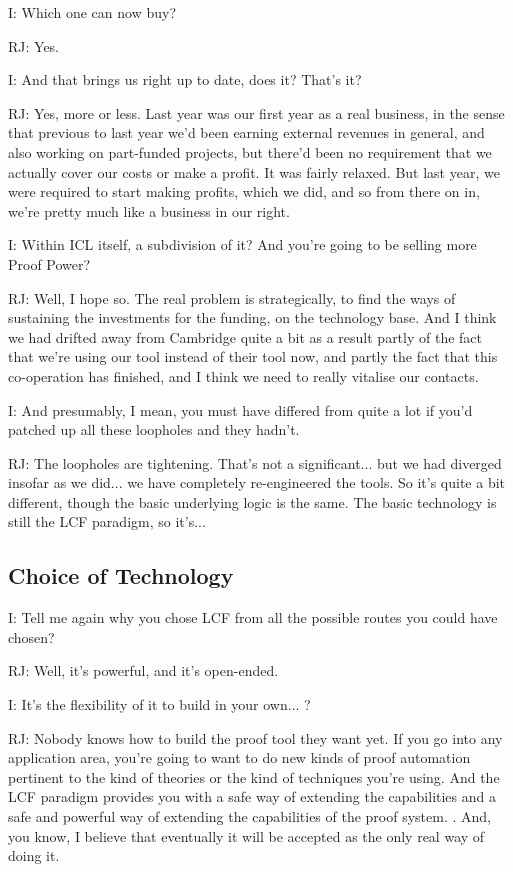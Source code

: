 \documentclass[10pt,titlepage]{book}
\begin{document}
I: Which one can now buy?

RJ: Yes.

I: And that brings us right up to date, does it?
That's it?


RJ: Yes, more or less. Last year was our first year as a real business, in the sense that  previous to last year we'd been earning external revenues in general, and also working on part-funded projects, but there'd been no requirement that we actually cover our costs or make a profit. It was fairly relaxed. But last year, we were required to start making profits, which we did, and so from there on in, we're pretty much like a business in our right.

I: Within ICL itself, a subdivision of it?
And you're going to be selling more Proof Power?

RJ: Well, I hope so.
The real problem is strategically, to find the ways of sustaining the investments for the funding, on the technology base.
And I think we had drifted away from Cambridge quite a bit as a result partly of the fact that we're using our tool instead of their tool now, and partly the fact that this co-operation has finished, and I think we need to really vitalise our contacts.

I: And presumably, I mean, you must have differed from quite a lot if you'd patched up all these loopholes and they hadn't.

RJ: The loopholes are tightening.
That's not a significant... but we had diverged insofar as we did... we have completely re-engineered the tools.
So it's quite a bit different, though the basic underlying logic is the same.
The basic technology is still the LCF paradigm, so it's...

\subsection{Choice of Technology}

I: Tell me again why you chose LCF from all the possible routes you could have chosen?

RJ: Well, it's powerful, and it's open-ended.

I: It's the flexibility of it to build in your own... ?

RJ: Nobody knows how to build the proof tool they want yet. If you go into any application area, you're going to want to do new kinds of proof automation pertinent to the kind of theories or the kind of techniques you're using. And the LCF paradigm provides you with a safe way of extending the capabilities and a safe and powerful way of extending the capabilities of the proof system. 		. And, you know, I believe that eventually it will be accepted as the only real way of doing it.
\end{document}
